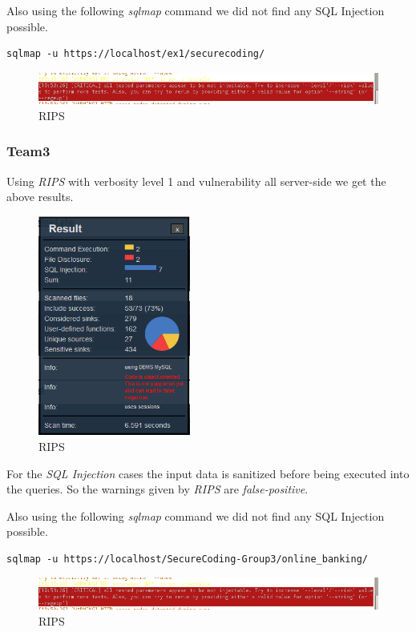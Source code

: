 \documentclass[headsepline,footsepline,footinclude=false,oneside,fontsize=11pt,paper=a4,listof=totoc,bibliography=totoc]{scrbook} %
\begin{document}
Also using the following \textit{sqlmap} command we did not find any SQL Injection possible.\\

\begin{lstlisting}
sqlmap -u https://localhost/ex1/securecoding/
\end{lstlisting}
\begin{figure}[ht!]
	\centering
	\includegraphics[width=175mm]{logos/sql.jpg}
	\caption{RIPS \label{overflow}}
\end{figure}
\pagebreak
\subsubsection{Team3}
Using \textit{RIPS} with verbosity level 1  and vulnerability all server-side we get the above results.
\begin{figure}[H]
	\centering
	\includegraphics[width=50mm]{logos/stats3.jpg}
	\caption{RIPS \label{overflow}}
\end{figure}


For the \textit{SQL Injection} cases the input data is sanitized before being executed into the queries. So the warnings given by \textit{RIPS} are \textit{false-positive}.

Also using the following \textit{sqlmap} command we did not find any SQL Injection possible.\\

\begin{lstlisting}
sqlmap -u https://localhost/SecureCoding-Group3/online_banking/
\end{lstlisting}
\begin{figure}[ht!]
	\centering
	\includegraphics[width=175mm]{logos/sql.jpg}
	\caption{RIPS \label{overflow}}
\end{figure}
\end{document}
